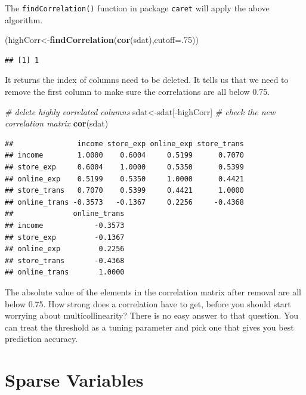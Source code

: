 \documentclass[12pt,]{krantz}
\newenvironment{Shaded}{\begin{snugshade}}{\end{snugshade}}
\newcommand{\KeywordTok}[1]{\textcolor[rgb]{0.13,0.29,0.53}{\textbf{{#1}}}}
\newcommand{\DataTypeTok}[1]{\textcolor[rgb]{0.13,0.29,0.53}{{#1}}}
\newcommand{\DecValTok}[1]{\textcolor[rgb]{0.00,0.00,0.81}{{#1}}}
\newcommand{\CommentTok}[1]{\textcolor[rgb]{0.56,0.35,0.01}{\textit{{#1}}}}
\newcommand{\NormalTok}[1]{{#1}}
\theoremstyle{definition}
\theoremstyle{definition}
\theoremstyle{remark}
\begin{document}
The \texttt{findCorrelation()} function in package \texttt{caret} will
apply the above algorithm.

\begin{Shaded}
\begin{Highlighting}[]
\NormalTok{(highCorr<-}\KeywordTok{findCorrelation}\NormalTok{(}\KeywordTok{cor}\NormalTok{(sdat),}\DataTypeTok{cutoff=}\NormalTok{.}\DecValTok{75}\NormalTok{))}
\end{Highlighting}
\end{Shaded}

\begin{verbatim}
## [1] 1
\end{verbatim}

It returns the index of columns need to be deleted. It tells us that we
need to remove the first column to make sure the correlations are all
below 0.75.

\begin{Shaded}
\begin{Highlighting}[]
\CommentTok{# delete highly correlated columns}
\NormalTok{sdat<-sdat[-highCorr]}
\CommentTok{# check the new correlation matrix}
\KeywordTok{cor}\NormalTok{(sdat)}
\end{Highlighting}
\end{Shaded}

\begin{verbatim}
##               income store_exp online_exp store_trans
## income        1.0000    0.6004     0.5199      0.7070
## store_exp     0.6004    1.0000     0.5350      0.5399
## online_exp    0.5199    0.5350     1.0000      0.4421
## store_trans   0.7070    0.5399     0.4421      1.0000
## online_trans -0.3573   -0.1367     0.2256     -0.4368
##              online_trans
## income            -0.3573
## store_exp         -0.1367
## online_exp         0.2256
## store_trans       -0.4368
## online_trans       1.0000
\end{verbatim}

The absolute value of the elements in the correlation matrix after
removal are all below 0.75. How strong does a correlation have to get,
before you should start worrying about multicollinearity? There is no
easy answer to that question. You can treat the threshold as a tuning
parameter and pick one that gives you best prediction accuracy.

\section{Sparse Variables}\label{sparse-variables}
\end{document}
